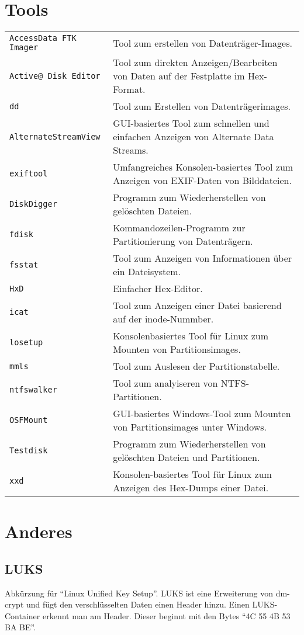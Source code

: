 \begin{multicols}{3}
\section{Tools}
\begin{tabular}{@{}p{\the\MyLen}
		@{}p{\linewidth-\the\MyLen}@{}}
	\texttt{AccessData FTK Imager} & Tool zum erstellen von Datenträger-Images.\\
	\texttt{Active@ Disk Editor} & Tool zum direkten Anzeigen/Bearbeiten von Daten auf der Festplatte im Hex-Format.\\
	\texttt{dd} & Tool zum Erstellen von Datenträgerimages.\\
	\texttt{Alternate\-Stream\-View} & GUI-basiertes Tool zum schnellen und einfachen Anzeigen von Alternate Data Streams.\\
	\texttt{exiftool} & Umfangreiches Konsolen-basiertes Tool zum Anzeigen von EXIF-Daten von Bilddateien.\\
	\texttt{DiskDigger} & Programm zum Wiederherstellen von gelöschten Dateien.\\
	\texttt{fdisk} & Kommandozeilen-Programm zur Partitionierung von Datenträgern.\\
	\texttt{fsstat} & Tool zum Anzeigen von Informationen über ein Dateisystem.\\
	\texttt{HxD} & Einfacher Hex-Editor.\\
	\texttt{icat} & Tool zum Anzeigen einer Datei basierend auf der inode-Nummber.\\
	\texttt{losetup} & Konsolenbasiertes Tool für Linux zum Mounten von Partitionsimages.\\
	\texttt{mmls} & Tool zum Auslesen der Partitionstabelle.\\
	\texttt{ntfswalker} & Tool zum analyiseren von NTFS-Partitionen.\\
	\texttt{OSFMount} & GUI-basiertes Windows-Tool zum Mounten von Partitionsimages unter Windows.\\
	\texttt{Testdisk} & Programm zum Wiederherstellen von gelöschten Dateien und Partitionen.\\
	\texttt{xxd} & Konsolen-basiertes Tool für Linux zum Anzeigen des Hex-Dumps einer Datei.\\
\end{tabular}
\section{Anderes}
\subsection{LUKS}
Abkürzung für \enquote{Linux Unified Key Setup}. LUKS ist eine Erweiterung von dm-crypt und fügt den verschlüsselten Daten einen Header hinzu. Einen LUKS-Container erkennt man am Header. Dieser beginnt mit den Bytes \enquote{4C 55 4B 53 BA BE}.
\end{multicols}